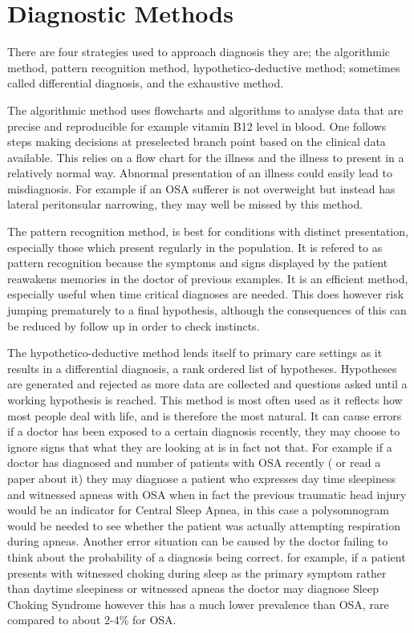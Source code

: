 \section{Diagnostic Methods}
There are four strategies used to approach diagnosis they are; the algorithmic method, pattern recognition method, hypothetico-deductive method; sometimes called differential diagnosis, and the exhaustive method. 

The algorithmic method uses flowcharts and algorithms to analyse data that are precise and reproducible for example vitamin B12 level in blood. One follows steps making decisions at preselected branch point based on the clinical data available. This relies on a flow chart for the illness and the illness to present in a relatively normal way. Abnormal presentation of an illness could easily lead to misdiagnosis. For example if an OSA sufferer is not overweight but instead has lateral peritonsular narrowing, they may well be missed by this method. 

The pattern recognition method, is best for conditions with distinct presentation, especially those which present regularly in the population. It is refered to as pattern recognition because the symptoms and signs displayed by the patient reawakens memories in the doctor of previous examples. It is an efficient method, especially useful when time critical diagnoses are needed. This does however risk jumping prematurely to a final hypothesis, although the consequences of this can be reduced by follow up in order to check instincts. 

The hypothetico-deductive method lends itself to primary care settings as it results in a differential diagnosis, a rank ordered list of hypotheses. Hypotheses are generated and rejected as more data are collected and questions asked until a working hypothesis is reached. This method is most often used as it reflects how most people deal with life, and is therefore the most natural. It can cause errors if a doctor has been exposed to a certain diagnosis recently, they may choose to ignore signs that what they are looking at is in fact not that. For example if a doctor has diagnosed and number of patients with OSA recently ( or read a paper about it) they may diagnose a patient who expresses day time sleepiness and witnessed apneas with OSA when in fact the previous traumatic head injury would be an indicator for Central Sleep Apnea, in this case a polysomnogram would be needed to see whether the patient was actually attempting respiration during apneas. Another error situation can be caused by the doctor failing to think about the probability of a diagnosis being correct. for example, if a patient presents with witnessed choking during sleep as the primary symptom rather than daytime sleepiness or witnessed apneas the doctor may diagnose Sleep Choking Syndrome however this has a much lower prevalence than OSA, rare compared to about 2-4\% for OSA.

